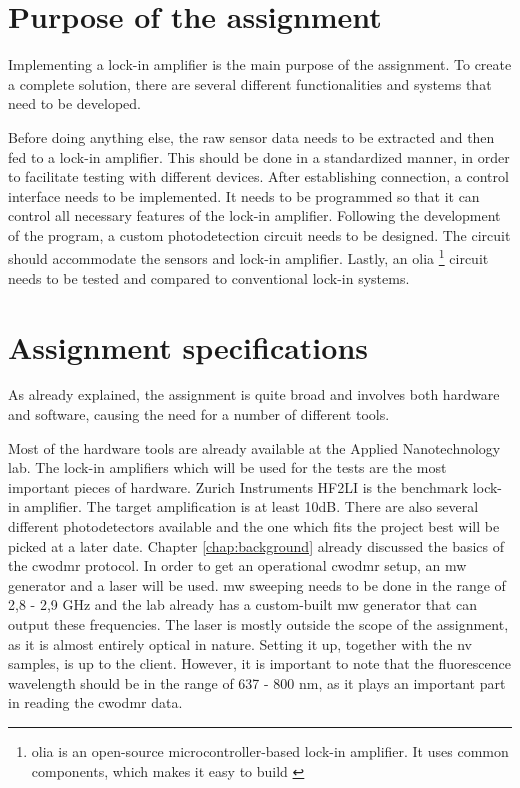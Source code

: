\section{Purpose of the assignment}\label{purpose}
Implementing a lock-in amplifier is the main purpose of the assignment. To create a complete solution, there are several different functionalities and systems that need to be developed. 

Before doing anything else, the raw sensor data needs to be extracted and then fed to a lock-in amplifier. This should be done in a standardized manner, in order to facilitate testing with different devices. After establishing connection, a control interface needs to be implemented. It needs to be programmed so that it can control all necessary features of the lock-in amplifier. Following the development of the program, a custom photodetection circuit needs to be designed. The circuit should accommodate the sensors and lock-in amplifier. Lastly, an \gls{olia} \footnote{\gls{olia} is an open-source microcontroller-based lock-in amplifier. It uses common components, which makes it easy to build \cite{harvie2023olia}} circuit needs to be tested and compared to conventional lock-in systems. 


\section{Assignment specifications}\label{specifications}
As already explained, the assignment is quite broad and involves both hardware and software, causing the need for a number of different tools. 

Most of the hardware tools are already available at the Applied Nanotechnology lab. The lock-in amplifiers which will be used for the tests are the most important pieces of hardware. Zurich Instruments HF2LI is the benchmark lock-in amplifier. The target amplification is at least 10dB. There are also several different photodetectors available and the one which fits the project best will be picked at a later date. Chapter \ref{chap:background} already discussed the basics of the \gls{cwodmr} protocol. In order to get an operational \gls{cwodmr} setup, an \gls{mw} generator and a laser will be used. \gls{mw} sweeping needs to be done in the range of 2,8 - 2,9 GHz and the lab already has a custom-built \gls{mw} generator that can output these frequencies. The laser is mostly outside the scope of the assignment, as it is almost entirely optical in nature. Setting it up, together with the \gls{nv} samples, is up to the client. However, it is important to note that the fluorescence wavelength should be in the range of 637 - 800 nm, as it plays an important part in reading the \gls{cwodmr} data.
	
